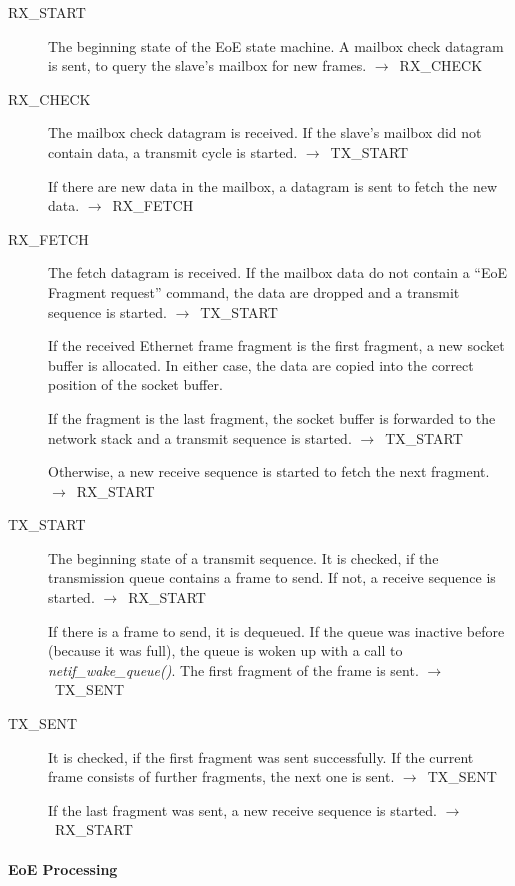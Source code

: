 \documentclass[a4paper,12pt,BCOR6mm,bibtotoc,idxtotoc]{scrbook}
\begin{document}
\begin{description}
\item[RX\_START] The beginning state of the EoE state machine. A
  mailbox check datagram is sent, to query the slave's mailbox for new
  frames. $\rightarrow$~RX\_CHECK

\item[RX\_CHECK] The mailbox check datagram is received. If the
  slave's mailbox did not contain data, a transmit cycle is started.
  $\rightarrow$~TX\_START

  If there are new data in the mailbox, a datagram is sent to fetch
  the new data. $\rightarrow$~RX\_FETCH

\item[RX\_FETCH] The fetch datagram is received. If the mailbox data
  do not contain a ``EoE Fragment request'' command, the data are
  dropped and a transmit sequence is started.
  $\rightarrow$~TX\_START

  If the received Ethernet frame fragment is the first fragment, a new
  socket buffer is allocated. In either case, the data are copied into
  the correct position of the socket buffer.

  If the fragment is the last fragment, the socket buffer is forwarded
  to the network stack and a transmit sequence is started.
  $\rightarrow$~TX\_START

  Otherwise, a new receive sequence is started to fetch the next
  fragment. $\rightarrow$~RX\_\-START

\item[TX\_START] The beginning state of a transmit sequence. It is
  checked, if the transmission queue contains a frame to send. If not,
  a receive sequence is started. $\rightarrow$~RX\_START

  If there is a frame to send, it is dequeued. If the queue was
  inactive before (because it was full), the queue is woken up with a
  call to \textit{netif\_wake\_queue()}. The first fragment of the
  frame is sent. $\rightarrow$~TX\_SENT

\item[TX\_SENT] It is checked, if the first fragment was sent
  successfully. If the current frame consists of further fragments,
  the next one is sent. $\rightarrow$~TX\_SENT

  If the last fragment was sent, a new receive sequence is started.
  $\rightarrow$~RX\_START
\end{description}

\paragraph{EoE Processing}
\end{document}
